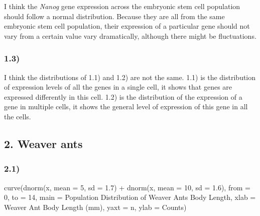\documentclass[
]{article}
\newenvironment{Shaded}{\begin{snugshade}}{\end{snugshade}}
\newcommand{\AttributeTok}[1]{\textcolor[rgb]{0.77,0.63,0.00}{#1}}
\newcommand{\DecValTok}[1]{\textcolor[rgb]{0.00,0.00,0.81}{#1}}
\newcommand{\FloatTok}[1]{\textcolor[rgb]{0.00,0.00,0.81}{#1}}
\newcommand{\FunctionTok}[1]{\textcolor[rgb]{0.00,0.00,0.00}{#1}}
\newcommand{\NormalTok}[1]{#1}
\newcommand{\SpecialCharTok}[1]{\textcolor[rgb]{0.00,0.00,0.00}{#1}}
\newcommand{\StringTok}[1]{\textcolor[rgb]{0.31,0.60,0.02}{#1}}
\begin{document}
I think the \emph{Nanog} gene expression across the embryonic stem cell
population should follow a normal distribution. Because they are all
from the same embryonic stem cell population, their expression of a
particular gene should not vary from a certain value vary dramatically,
although there might be fluctuations.

\hypertarget{section-2}{%
\subsubsection{1.3)}\label{section-2}}

I think the distributions of 1.1) and 1.2) are not the same. 1.1) is the
distribution of expression levels of all the genes in a single cell, it
shows that genes are expressed differently in this cell. 1.2) is the
distribution of the expression of a gene in multiple cells, it shows the
general level of expression of this gene in all the cells.

\hypertarget{weaver-ants}{%
\subsection{2. Weaver ants}\label{weaver-ants}}

\hypertarget{section-3}{%
\subsubsection{2.1)}\label{section-3}}

\begin{Shaded}
\begin{Highlighting}[]
\FunctionTok{curve}\NormalTok{(}\FunctionTok{dnorm}\NormalTok{(x, }\AttributeTok{mean =} \DecValTok{5}\NormalTok{, }\AttributeTok{sd =} \FloatTok{1.7}\NormalTok{) }\SpecialCharTok{+} \FunctionTok{dnorm}\NormalTok{(x, }\AttributeTok{mean =} \DecValTok{10}\NormalTok{, }\AttributeTok{sd =} \FloatTok{1.6}\NormalTok{),}
      \AttributeTok{from =} \DecValTok{0}\NormalTok{, }\AttributeTok{to =} \DecValTok{14}\NormalTok{,}
      \AttributeTok{main =} \StringTok{\textquotesingle{}Population Distribution of Weaver Ants Body Length\textquotesingle{}}\NormalTok{,}
      \AttributeTok{xlab =} \StringTok{\textquotesingle{}Weaver Ant Body Length (mm)\textquotesingle{}}\NormalTok{,}
      \AttributeTok{yaxt =} \StringTok{\textquotesingle{}n\textquotesingle{}}\NormalTok{, }\AttributeTok{ylab =} \StringTok{\textquotesingle{}Counts\textquotesingle{}}\NormalTok{)}
\end{Highlighting}
\end{Shaded}
\end{document}

